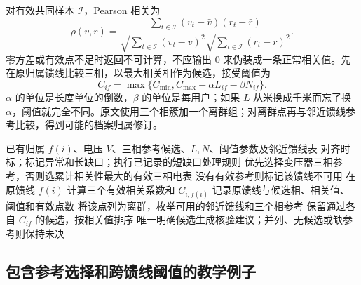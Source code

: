 对有效共同样本 $\mathcal I$，Pearson 相关为
\begin{equation}
 \rho(v,r)=\frac{\sum_{t\in\mathcal I}(v_t-\bar v)(r_t-\bar r)}
 {\sqrt{\sum_{t\in\mathcal I}(v_t-\bar v)^2}
  \sqrt{\sum_{t\in\mathcal I}(r_t-\bar r)^2}}.
 \label{eq:dq_s8_corr}
\end{equation}
零方差或有效点不足时返回不可计算，不应输出 0 来伪装成一条正常相关值。先在原归属馈线比较三相，以最大相关相作为候选，接受阈值为
\begin{equation}
 C_{if}=\max\{C_{\min},C_{\max}-\alpha L_{if}-\beta N_{if}\}.
 \label{eq:dq_s8_threshold}
\end{equation}
$\alpha$ 的单位是长度单位的倒数，$\beta$ 的单位是每用户；如果 $L$ 从米换成千米而忘了换 $\alpha$，阈值就完全不同。原文使用三个相簇加一个离群组；对离群点再与邻近馈线参考比较，得到可能的档案归属修订。

\begin{algorithm}[tbp]
\caption{S8 的实际匹配链：原流程整理，异常出口显式化}
\label{alg:dq_s8}
\begin{algorithmic}[1]
\Require 已有归属 $f(i)$、电压 $V$、三相参考候选、$L,N$、阈值参数及邻近馈线表
\State 对齐时标；标记异常和长缺口；执行已记录的短缺口处理规则
 \State 优先选择变压器三相参考，否则选累计相关性最大的有效三相电表
 \State 没有有效参考则标记该馈线不可用
\EndFor
{}
 \State 在原馈线 $f(i)$ 计算三个有效相关系数和 $C_{i,f(i)}$
   \State 记录原馈线与候选相、相关值、阈值和有效点数
 \Else
   \State 将该点列为离群，枚举可用的邻近馈线和三个相参考
   \State 保留通过各自 $C_{if}$ 的候选，按相关值排序
   \State 唯一明确候选生成核验建议；并列、无候选或缺参考则保持未决
 \EndIf
\EndFor
\end{algorithmic}
\end{algorithm}

\subsection{包含参考选择和跨馈线阈值的教学例子}

